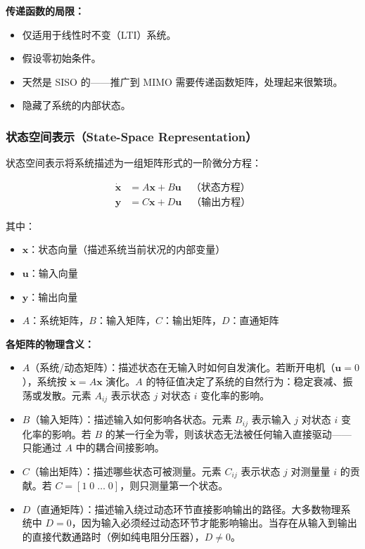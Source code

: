 \textbf{传递函数的局限：}
\begin{itemize}
    \item 仅适用于线性时不变（LTI）系统。
    \item 假设零初始条件。
    \item 天然是 SISO 的——推广到 MIMO 需要传递函数矩阵，处理起来很繁琐。
    \item 隐藏了系统的内部状态。
\end{itemize}

\subsubsection{状态空间表示（State-Space Representation）}

状态空间表示将系统描述为一组矩阵形式的一阶微分方程：

\begin{align}
\dot{\mathbf{x}} &= A\mathbf{x} + B\mathbf{u} \quad \text{（状态方程）} \\
\mathbf{y} &= C\mathbf{x} + D\mathbf{u} \quad \text{（输出方程）}
\end{align}

其中：
\begin{itemize}[nosep]
    \item $\mathbf{x}$：状态向量（描述系统当前状况的内部变量）
    \item $\mathbf{u}$：输入向量
    \item $\mathbf{y}$：输出向量
    \item $A$：系统矩阵，$B$：输入矩阵，$C$：输出矩阵，$D$：直通矩阵
\end{itemize}

\textbf{各矩阵的物理含义：}
\begin{itemize}
    \item $A$（系统/动态矩阵）：描述状态在无输入时如何自发演化。若断开电机（$\mathbf{u} = 0$），系统按 $\dot{\mathbf{x}} = A\mathbf{x}$ 演化。$A$ 的特征值决定了系统的自然行为：稳定衰减、振荡或发散。元素 $A_{ij}$ 表示状态 $j$ 对状态 $i$ 变化率的影响。
    \item $B$（输入矩阵）：描述输入如何影响各状态。元素 $B_{ij}$ 表示输入 $j$ 对状态 $i$ 变化率的影响。若 $B$ 的某一行全为零，则该状态无法被任何输入直接驱动——只能通过 $A$ 中的耦合间接影响。
    \item $C$（输出矩阵）：描述哪些状态可被测量。元素 $C_{ij}$ 表示状态 $j$ 对测量量 $i$ 的贡献。若 $C = [1\;0\;\ldots\;0]$，则只测量第一个状态。
    \item $D$（直通矩阵）：描述输入绕过动态环节直接影响输出的路径。大多数物理系统中 $D = 0$，因为输入必须经过动态环节才能影响输出。当存在从输入到输出的直接代数通路时（例如纯电阻分压器），$D \neq 0$。
\end{itemize}

